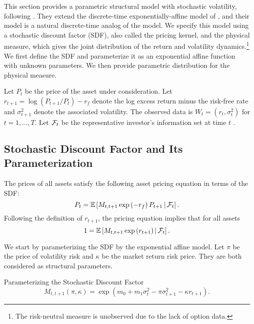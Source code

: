 This section provides a parametric structural model with stochastic volatility, following \textcite{han2018leverage}. They extend the discrete-time exponentially-affine model of \textcite{darolles2006structural}, and their model is a natural discrete-time analog of the \textcite{heston1993closedform} model. We specify this model using a stochastic discount factor (SDF), also called the pricing kernel, and the physical measure, which gives the joint distribution of the return and volatility dynamics.\footnote{The risk-neutral measure is unobserved due to the lack of option data.} We first define the SDF and parameterize it as an exponential affine function with unknown parameters. We then provide parametric distribution for the physical measure. 
  
Let $P_t$ be the price of the asset under consideration. Let $r_{t+1}=\log(P_{t+1}/P_t)-r_f$ denote the log excess return minus the risk-free rate and $\sigma^2_{t+1}$ denote the associated volatility. The observed data is $W_t=(r_t,\sigma^2_{t})$ for $t=1,\ldots,T$. 
Let $\mathcal{F}_t$ be the representative investor's information set at time $t$ . 

\subsection{Stochastic Discount Factor and Its Parameterization}\label{sec:deriving_sdf_functions}

The prices of all assets satisfy the following asset pricing equation in terms of the SDF:
%
\begin{equation}
  P_t = \operatorname{\mathbb{E}}\left[M_{t,t+1} \exp\left(-r_f\right) P_{t+1} \,\middle\vert\, \mathcal{F}_t \right]. 
\end{equation}
%
  Following the definition of $r_{t+1}$, the pricing equation implies that for all assets
%
\begin{equation}
1 = \operatorname{\mathbb{E}}\left[M_{t,t+1} \exp\left(r_{t+1}\right) \,\middle\vert\, \mathcal{F}_t \right].
\end{equation}

We start by parameterizing the SDF by the exponential affine model. Let $\pi$ be the price of volatility risk and $\kappa$ be the market return risk price. They are both considered as structural parameters.

\begin{definition}{Parameterizing the Stochastic Discount Factor}
 \label{defn:SDF}
%
 \begin{equation}
    M_{t,t+1}(\pi, \kappa) = \exp\left(m_{0} + m_1 \sigma_t^2 - \pi \sigma^2_{t+1} - \kappa r_{t+1}\right). 
 \end{equation}
\end{definition}

